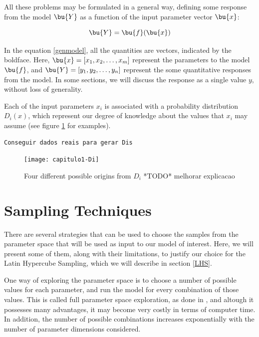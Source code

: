 All these problems may be formulated in a general way, defining some response 
from the model $\bu{Y}$ as a function of the input parameter vector $\bu{x}$:

\begin{equation}
	\bu{Y} = \bu{f}(\bu{x})
	\label{genmodel}
\end{equation}

In the equation \ref{genmodel}, all the quantities are vectors, indicated by
the boldface. Here, $\bu{x} = [ x_1,x_2,\dots,x_m ]$ represent the parameters
to the model $\bu{f}$, and $\bu{Y} = [ y_1,y_2,\dots,y_n ]$ represent the some
quantitative responses from the model. In some sections, we will discuss the
response as a single value $y$, without loss of generality.

Each of the input parameters $x_i$ is associated with a probability distribution
$D_i(x)$, which represent our degree of knowledge about the values that $x_i$ may
assume (see figure \ref{fig:Di} for examples).

\begin{verbatim}
Conseguir dados reais para gerar Dis
\end{verbatim}

\begin{figure}[htpb]
	\begin{center}
	
\texttt{[image: capitulo1-Di]}
	\end{center}
	\caption{Four different possible origins from $D_i$ *TODO* melhorar explicacao}
	\label{fig:Di}
\end{figure}

\section{Sampling Techniques}\label{Sampling}
There are several strategies that can be used to choose the samples from the
parameter space that will be used as input to our model of interest. Here,
we will present some of them, along with their limitations, to justify our 
choice for the Latin Hypercube Sampling, which we will describe in section
\ref{LHS}.

One way of exploring the parameter space is to choose a number of possible 
values for each parameter, and run the model for every combination of those 
values. This is called full parameter space exploration, as done 
in \cite{Turchin97}, and altough it 
possesses many advantages, it may become very costly in terms of computer time. 
In addition, the number of possible combinations increases exponentially with 
the number of parameter dimensions considered.


